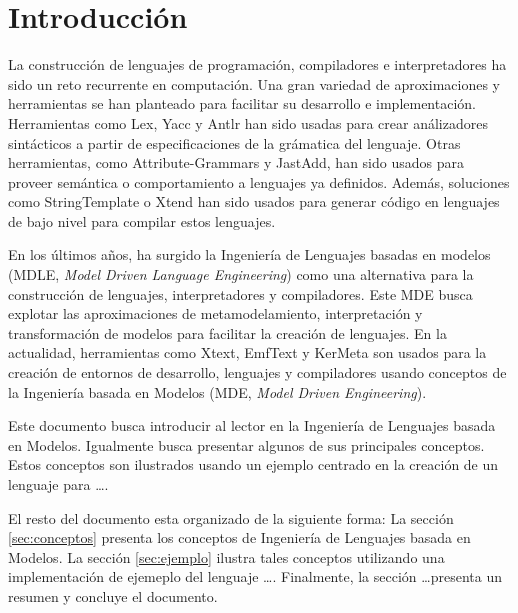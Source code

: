 

\section{Introducción}
\label{sec:introduccion}


La construcción de lenguajes de programación, compiladores e interpretadores ha sido un reto recurrente en computación.
Una gran variedad de aproximaciones y herramientas se han planteado para facilitar su desarrollo e implementación.
Herramientas como Lex, Yacc y Antlr han sido usadas para crear análizadores sintácticos a partir de especificaciones de la grámatica del lenguaje.
Otras herramientas, como Attribute-Grammars y JastAdd, han sido usados para proveer semántica o comportamiento a lenguajes ya definidos.
Además, soluciones como StringTemplate o Xtend han sido usados para generar código en lenguajes de bajo nivel para compilar estos lenguajes.


En los últimos años, ha surgido la Ingeniería de Lenguajes basadas en modelos (MDLE, \textit{Model Driven Language Engineering}) como una alternativa para la construcción de lenguajes, interpretadores y compiladores.
Este MDE busca explotar las aproximaciones de metamodelamiento, interpretación y transformación de modelos para facilitar la creación de lenguajes. 
En la actualidad, herramientas como Xtext, EmfText y KerMeta son usados para la creación de entornos de desarrollo, lenguajes y compiladores usando conceptos de la Ingeniería basada en Modelos (MDE, \textit{Model Driven Engineering}).


Este documento busca introducir al lector en la Ingeniería de Lenguajes basada en Modelos.
Igualmente busca presentar algunos de sus principales conceptos.
Estos conceptos son ilustrados usando un ejemplo centrado en la creación de un lenguaje para \ldots.


El resto del documento esta organizado de la siguiente forma:
La sección \ref{sec:conceptos} presenta los conceptos de Ingeniería de Lenguajes basada en Modelos.
La sección \ref{sec:ejemplo} ilustra tales conceptos utilizando una implementación de ejemeplo del lenguaje \ldots.
Finalmente, la sección \ldots presenta un resumen y concluye el documento.